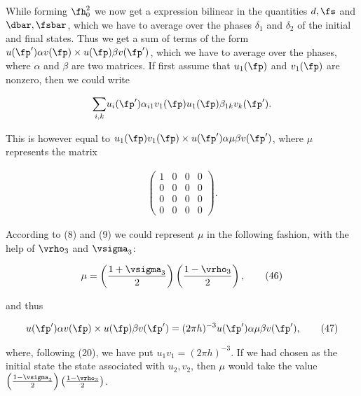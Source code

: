 \documentclass{article}
\newcommand{\nequ}[2]{
\begin{align*}
#1
\tag{#2}
\end{align*}
}
\newcommand{\uequ}[1]{
\begin{align*}
#1
\end{align*}
}
\newcommand{\sumX}[1]{\underset{#1}{\sum}}
\begin{document}
While forming $\fh_0^2$ we now get a expression bilinear in the quantities $d,\fs$ and $\dbar,\fsbar$, which we have to average over the phases $\delta_1$ and $\delta_2$ of the initial and final states. Thus we get a sum of terms of the form $u(\fp')\alpha v(\fp)\times u(\fp)\beta v(\fp')$, which we have to average over the phases, where $\alpha$ and $\beta$ are two matrices. If first assume that $u_1(\fp)$ and $v_1(\fp)$ are nonzero, then we could write
\uequ{
\sumX{i,k}u_i(\fp')\alpha_{i1}v_1(\fp)u_1(\fp)\beta_{1k}v_k(\fp').
}
This is however equal to $u_1(\fp)v_1(\fp)\times u(\fp')\alpha\mu\beta v(\fp')$, where $\mu$ represents the matrix
\uequ{
\left(\begin{matrix}
1 & 0 & 0 & 0 \\
0 & 0 & 0 & 0 \\
0 & 0 & 0 & 0 \\
0 & 0 & 0 & 0
\end{matrix}\right).
}

According to (8) and (9) we could represent $\mu$ in the following fashion, with the help of $\vrho_3$ and $\vsigma_3$:
\nequ{
\mu = \left(\frac{1+\vsigma_3}{2}\right)\left(\frac{1-\vrho_3}{2}\right),
}{46}
and thus
\nequ{
u(\fp')\alpha v(\fp)\times u(\fp)\beta v(\fp') 
= (2\pi h)^{-3}u(\fp')\alpha\mu\beta v(\fp'),
}{47}
where, following (20), we have put $u_1 v_1 = (2\pi h)^{-3}$. If we had chosen as the initial state the state associated with $u_2, v_2$, then $\mu$ would take the value $\left(\frac{1-\vsigma_3}{2}\right)\left(\frac{1-\vrho_3}{2}\right)$.
\end{document}
